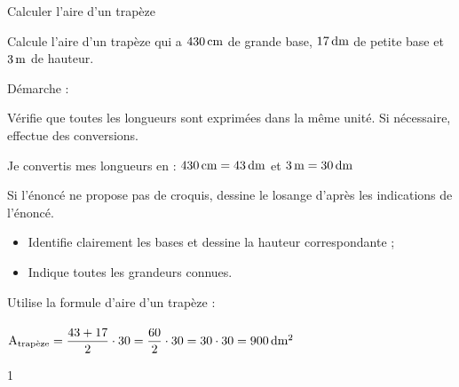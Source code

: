 \documentclass[a4paper,11pt]{report}
\let\oldcenter\center
\let\oldendcenter\endcenter
\renewenvironment{center}{\setlength\topsep{-10pt}\oldcenter}{\oldendcenter}
\begin{document}
\begin{resolu}{Calculer l'aire d'un trapèze}{
		Calcule l'aire d'un trapèze qui a $\tunit{430}{cm}$ de grande base, $\tunit{17}{dm}$ de petite base et $\tunit{3}{m}$ de hauteur.

Démarche :
\begin{tasks}
    \task Vérifie que toutes les longueurs sont exprimées dans la même unité. Si nécessaire, effectue des conversions.
    
    {\color{blue} Je convertis mes longueurs en  : $\tunit{430}{cm}=\tunit{43}{dm}$ et $\tunit{3}{m}=\tunit{30}{dm}$}
\end{tasks}
\begin{tasks}
	\task[b)] Si l'énoncé ne propose pas de croquis, dessine le losange d'après les indications de l'énoncé.
    \begin{itemize}
        \item Identifie clairement les bases et dessine la hauteur correspondante ;
        \item Indique toutes les grandeurs connues.
    \end{itemize}
\end{tasks}
    \begin{center}
    \end{center}
\vspace{-0.8cm}
\begin{tasks}
\task[c)] Utilise la formule d'aire d'un trapèze : \\
    
     \\
      
    $\textrm{A}_{\textrm{trapèze}}=\dfrac{43+17}{2}\cdot30=\dfrac{60}{2}\cdot30=30\cdot30=\tunit{900}{dm^2}$
\end{tasks}
}{1} 
\end{resolu}
\end{document}
